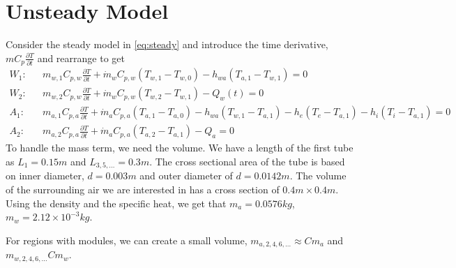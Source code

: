 \documentclass[11pt]{article}
\begin{document}
\section{Unsteady Model}
Consider the steady model in \ref{eq:steady} and introduce the time derivative, $mC_{p}\frac{\partial T}{\partial t}$ and rearrange to get 
\begin{eqnarray} 
W_1: & & m_{w,1}C_{p,w}\frac{\partial T}{\partial t} + \dot{m}_wC_{p,w}(T_{w,1}-T_{w,0}) - h_{wa}(T_{a,1}-T_{w,1}) = 0 \\
W_2: & & m_{w,2}C_{p,w}\frac{\partial T}{\partial t} + \dot{m}_wC_{p,w}(T_{w,2}-T_{w,1}) - Q_w(t) = 0\\
A_1: & & m_{a,1}C_{p,a}\frac{\partial T}{\partial t} + \dot{m}_aC_{p,a}(T_{a,1}-T_{a,0}) - h_{wa}(T_{w,1}-T_{a,1}) - h_{e}(T_e-T_{a,1}) - h_{i}(T_i-T_{a,1})= 0 \\
A_2: & & m_{a,2}C_{p,a}\frac{\partial T}{\partial t} +\dot{m}_aC_{p,a}(T_{a,2}-T_{a,1}) - Q_a = 0 
\end{eqnarray}
To handle the mass term, we need the volume. We have a length of the first tube as $L_1 = 0.15m$ and $L_{3,5,\ldots} = 0.3m$. The cross sectional area of the tube is based on inner diameter, $d = 0.003m$ and outer diameter of $d = 0.0142m$. The volume of the surrounding air we are interested in has a cross section of $0.4m \times 0.4m$. Using the density and the specific heat, we get that $m_a = 0.0576 kg$, $m_w = 2.12\times 10^{-3} kg$.

For regions with modules, we can create a small volume, $m_{a,2,4,6,\ldots} \approx Cm_a$ and $m_{w,2,4,6,\ldots} Cm_w$. 
\end{document}
